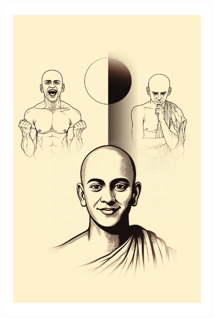 \clearpage
{} %
\thispagestyle{empty}
\begin{figure}
\centering
\includegraphics[width=\paperwidth, height=\paperheight, keepaspectratio]{../images/003.jpg}
\end{figure}
\restoregeometry %
\newpage

